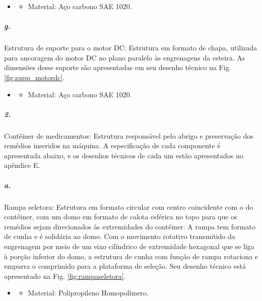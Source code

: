     \begin{itemize}
   \item[]
   \begin{itemize}
       \item Material: Aço carbono SAE 1020.
   \end{itemize}
   \end{itemize}
     
    
    
    \subparagraph*{g.} \label{Retorno_suporte_motorDC}
    Estrutura de suporte para o motor DC: Estrutura em formato de chapa, utilizada para ancoragem do motor DC no plano paralelo às engrenagens da esteira.  As dimensões desse suporte são apresentadas em seu desenho técnico na Fig. \ref{fig:supp_motordc}.
    
    \begin{itemize}
   \item[]
   \begin{itemize}
       \item Material: Aço carbono SAE 1020.
   \end{itemize}
   \end{itemize}
     


\subparagraph*{2.}
Contêiner de medicamentos: Estrutura responsável pelo abrigo e preservação dos remédios inseridos na máquina. A especificação de cada componente é apresentada abaixo, e os desenhos técnicos de cada um estão apresentados no apêndice E.

    \subparagraph*{a.} \label{retorno_rampaseletora}
    Rampa seletora: Estrutura em formato circular com centro coincidente com o do contêiner, com um domo em formato de calota esférica no topo para que os remédios sejam direcionados às extremidades do contêiner. A rampa tem formato de cunha e é solidária ao domo. Com o movimento rotativo transmitido da engrenagem por meio de um eixo cilíndrico de extremidade hexagonal que se liga à porção inferior do domo, a estrutura de cunha com função de rampa rotaciona e empurra o comprimido para a plataforma de seleção.
    Seu desenho técnico está apresentado na Fig. \ref{fig:rampaseletora}.
    
    \begin{itemize}
   \item[]
   \begin{itemize}
       \item Material: Polipropileno Homopolímero.
   \end{itemize}
   \end{itemize}
     
